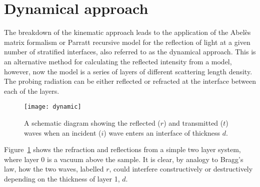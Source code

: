\documentclass[
 reprint,
 superscriptaddress,
 amsmath,amssymb,
 aps,
]{revtex4-1}
\begin{document}
\section{Dynamical approach}
The breakdown of the kinematic approach leads to the application of the Abel\`{e}s matrix formalism \cite{abeles_sur_1948} or Parratt \cite{parratt_surface_1954} recursive model for the reflection of light at a given number of stratified interfaces, also referred to as the dynamical approach.
This is an alternative method for calculating the reflected intensity from a model, however, now the model is a series of layers of different scattering length density.
The probing radiation can be either reflected or refracted at the interface between each of the layers.
%
\begin{figure}[t]
    \texttt{[image: dynamic]}
    \caption{A schematic diagram showing the reflected ($r$) and transmitted ($t$) waves when an incident ($i$) wave enters an interface of thickness $d$.}
    \label{fig:refr}
\end{figure}
%
Figure~\ref{fig:refr} shows the refraction and reflections from a simple two layer system, where layer \num{0} is a vacuum above the sample.
It is clear, by analogy to Bragg's law, how the two waves, labelled $r$, could interfere constructively or destructively depending on the thickness of layer \num{1}, $d$.
\end{document}
